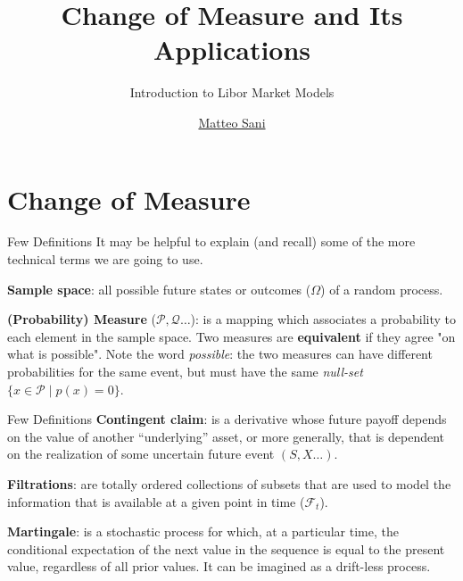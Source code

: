 \documentclass{beamer}
\title{Change of Measure and Its Applications}
\subtitle{Introduction to Libor Market Models}
\author{\href{mailto:matteo.sani@unisi.it}{Matteo Sani}}
\begin{document}
\begin{frame}[plain]
  \maketitle
\end{frame}

\section{Change of Measure}
\begin{frame}{Few Definitions}
  It may be helpful to explain (and recall) some of the more technical terms we are going to use.\newline
  
  \textbf{Sample space}: all possible future states or outcomes ($\Omega$) of a random process.\newline
  
  \textbf{(Probability) Measure} ($\mathcal{P}, \mathcal{Q}\ldots$): is a mapping which associates a probability to each element in the sample space. Two measures are \textbf{equivalent} if they agree "on what is possible". Note the word \emph{possible}: the two measures can have different probabilities for the same event, but must have the same \emph{null-set} $\{x\in {\mathcal {P}}\mid p (x)=0\}$. 
\end{frame}

\begin{frame}{Few Definitions}
  \textbf{Contingent claim}: is a derivative whose future payoff depends on the value of another “underlying” asset, or more generally, that is dependent on the realization of some uncertain future event $(S, X\ldots)$.\newline
  
  \textbf{Filtrations}: are totally ordered collections of subsets that are used to model the information that is available at a given point in time ($\mathcal{F}_t$). \newline
  
  \textbf{Martingale}: is a stochastic process for which, at a particular time, the conditional expectation of the next value in the sequence is equal to the present value, regardless of all prior values. It can be imagined as a drift-less process.
\end{frame}
\end{document}
